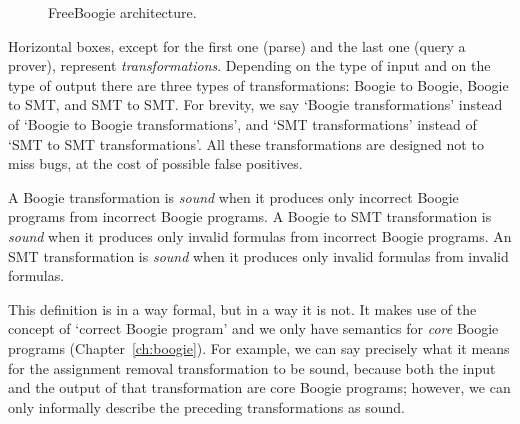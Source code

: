 \documentclass{llncs}
\begin{document}
\begin{figure} %
  \centering
  \caption{FreeBoogie architecture.}
  \label{fig:architecture}
\end{figure} %

Horizontal boxes, except for the first one (parse) and the last
one (query a prover), represent \emph{transformations}. Depending
on the type of input and on the type of output there are three
types of transformations: Boogie to Boogie, Boogie to SMT, and
SMT to SMT\null. For brevity, we say `Boogie transformations'
instead of `Boogie to Boogie transformations', and `SMT
transformations' instead of `SMT to SMT transformations'. All
these transformations are designed not to miss bugs, at the cost
of possible false positives.

\begin{definition}
A Boogie transformation is \emph{sound} when it produces only
incorrect Boogie programs from incorrect Boogie programs. A
Boogie to SMT transformation is \emph{sound} when it produces
only invalid formulas from incorrect Boogie programs. An SMT
transformation is \emph{sound} when it produces only invalid
formulas from invalid formulas.
\label{def:sound-transform}
\end{definition}

\begin{remark}
This definition is in a way formal, but in a way it is not.
It makes use of the concept of `correct Boogie program'
and we only have semantics for \emph{core} Boogie programs
(Chapter~\ref{ch:boogie}). For example, we can say precisely what
it means for the assignment removal transformation to be sound,
because both the input and the output of that transformation are
core Boogie programs; however, we can only informally describe
the preceding transformations as sound.
\end{remark}
\end{document}
